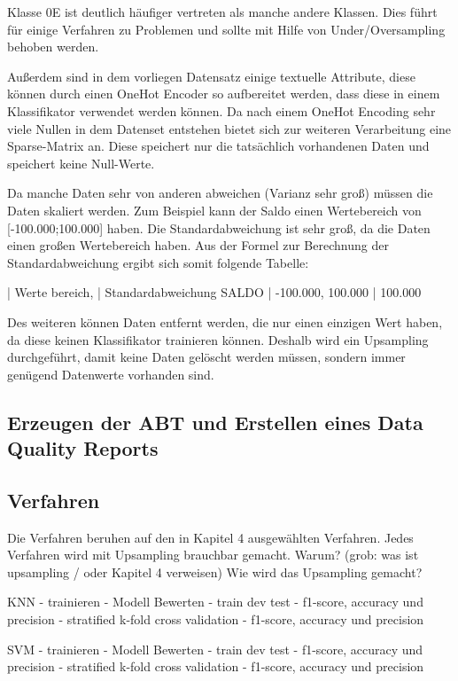 Klasse 0E ist deutlich häufiger vertreten als manche andere Klassen. 
Dies führt für einige Verfahren zu Problemen und sollte mit Hilfe von Under/Oversampling behoben werden.

Außerdem sind in dem vorliegen Datensatz einige textuelle Attribute, diese können durch einen OneHot Encoder so aufbereitet werden, dass diese in einem Klassifikator verwendet werden können.
Da nach einem OneHot Encoding sehr viele Nullen in dem Datenset entstehen bietet sich zur weiteren Verarbeitung eine Sparse-Matrix an.
Diese speichert nur die tatsächlich vorhandenen Daten und speichert keine Null-Werte. %

Da manche Daten sehr von anderen abweichen (Varianz sehr groß) müssen die Daten skaliert werden.
Zum Beispiel kann der Saldo einen Wertebereich von [-100.000;100.000] haben.
Die Standardabweichung ist sehr groß, da die Daten einen großen Wertebereich haben.
Aus der Formel zur Berechnung der Standardabweichung ergibt sich somit folgende Tabelle:

      | Werte bereich,      | Standardabweichung
SALDO | -100.000, 100.000   | 100.000


Des weiteren können Daten entfernt werden, die nur einen einzigen Wert haben, da diese keinen Klassifikator trainieren können.
Deshalb wird ein Upsampling durchgeführt, damit keine Daten gelöscht werden müssen, sondern immer genügend Datenwerte vorhanden sind.

\subsection{Erzeugen der ABT und Erstellen eines Data Quality Reports}

\subsection{Verfahren}
Die Verfahren beruhen auf den in Kapitel 4 ausgewählten Verfahren.
Jedes Verfahren wird mit Upsampling brauchbar gemacht.
Warum? (grob: was ist upsampling / oder Kapitel 4 verweisen)
Wie wird das Upsampling gemacht?

KNN
- trainieren
- Modell Bewerten 
    - train dev test
    - f1-score, accuracy und precision
    - stratified k-fold cross validation
    - f1-score, accuracy und precision 

    
SVM
- trainieren
- Modell Bewerten 
    - train dev test
    - f1-score, accuracy und precision
    - stratified k-fold cross validation
    - f1-score, accuracy und precision 

